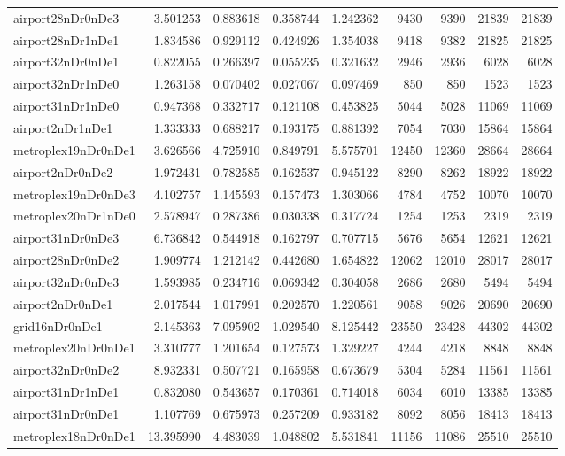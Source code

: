 \begin{longtable}{|l|r|r|r|r|r|r|r|r|}
airport28nDr0nDe3 & 3.501253 & 0.883618 & 0.358744 & 1.242362 & 9430 & 9390 & 21839 & 21839 \\
airport28nDr1nDe1 & 1.834586 & 0.929112 & 0.424926 & 1.354038 & 9418 & 9382 & 21825 & 21825 \\
airport32nDr0nDe1 & 0.822055 & 0.266397 & 0.055235 & 0.321632 & 2946 & 2936 & 6028 & 6028 \\
airport32nDr1nDe0 & 1.263158 & 0.070402 & 0.027067 & 0.097469 & 850 & 850 & 1523 & 1523 \\
airport31nDr1nDe0 & 0.947368 & 0.332717 & 0.121108 & 0.453825 & 5044 & 5028 & 11069 & 11069 \\
airport2nDr1nDe1 & 1.333333 & 0.688217 & 0.193175 & 0.881392 & 7054 & 7030 & 15864 & 15864 \\
metroplex19nDr0nDe1 & 3.626566 & 4.725910 & 0.849791 & 5.575701 & 12450 & 12360 & 28664 & 28664 \\
airport2nDr0nDe2 & 1.972431 & 0.782585 & 0.162537 & 0.945122 & 8290 & 8262 & 18922 & 18922 \\
metroplex19nDr0nDe3 & 4.102757 & 1.145593 & 0.157473 & 1.303066 & 4784 & 4752 & 10070 & 10070 \\
metroplex20nDr1nDe0 & 2.578947 & 0.287386 & 0.030338 & 0.317724 & 1254 & 1253 & 2319 & 2319 \\
airport31nDr0nDe3 & 6.736842 & 0.544918 & 0.162797 & 0.707715 & 5676 & 5654 & 12621 & 12621 \\
airport28nDr0nDe2 & 1.909774 & 1.212142 & 0.442680 & 1.654822 & 12062 & 12010 & 28017 & 28017 \\
airport32nDr0nDe3 & 1.593985 & 0.234716 & 0.069342 & 0.304058 & 2686 & 2680 & 5494 & 5494 \\
airport2nDr0nDe1 & 2.017544 & 1.017991 & 0.202570 & 1.220561 & 9058 & 9026 & 20690 & 20690 \\
grid16nDr0nDe1 & 2.145363 & 7.095902 & 1.029540 & 8.125442 & 23550 & 23428 & 44302 & 44302 \\
metroplex20nDr0nDe1 & 3.310777 & 1.201654 & 0.127573 & 1.329227 & 4244 & 4218 & 8848 & 8848 \\
airport32nDr0nDe2 & 8.932331 & 0.507721 & 0.165958 & 0.673679 & 5304 & 5284 & 11561 & 11561 \\
airport31nDr1nDe1 & 0.832080 & 0.543657 & 0.170361 & 0.714018 & 6034 & 6010 & 13385 & 13385 \\
airport31nDr0nDe1 & 1.107769 & 0.675973 & 0.257209 & 0.933182 & 8092 & 8056 & 18413 & 18413 \\
metroplex18nDr0nDe1 & 13.395990 & 4.483039 & 1.048802 & 5.531841 & 11156 & 11086 & 25510 & 25510 \\

\end{longtable}
